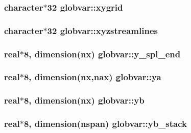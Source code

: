 \subsubsection[{xygrid}]{\setlength{\rightskip}{0pt plus 5cm}character$\ast$32 globvar\+::xygrid}\label{namespaceglobvar_a32441db96414a17de3451c8789d1edb3}
\hypertarget{namespaceglobvar_a683af9844336d830d4c99a6f542260ad}{}
\subsubsection[{xyzstreamlines}]{\setlength{\rightskip}{0pt plus 5cm}character$\ast$32 globvar\+::xyzstreamlines}\label{namespaceglobvar_a683af9844336d830d4c99a6f542260ad}
\hypertarget{namespaceglobvar_a5512ca98f844211a8ecb85b0be7168cc}{}
\subsubsection[{y\+\_\+spl\+\_\+end}]{\setlength{\rightskip}{0pt plus 5cm}real$\ast$8, dimension({\bf nx}) globvar\+::y\+\_\+spl\+\_\+end}\label{namespaceglobvar_a5512ca98f844211a8ecb85b0be7168cc}
\hypertarget{namespaceglobvar_a53530e27d02ce2d76dafdca13f4b8ed7}{}
\subsubsection[{ya}]{\setlength{\rightskip}{0pt plus 5cm}real$\ast$8, dimension({\bf nx},{\bf nax}) globvar\+::ya}\label{namespaceglobvar_a53530e27d02ce2d76dafdca13f4b8ed7}
\hypertarget{namespaceglobvar_a77b51c294ee3b20cb6e14dcbf4cb6b3d}{}
\subsubsection[{yb}]{\setlength{\rightskip}{0pt plus 5cm}real$\ast$8, dimension({\bf nx}) globvar\+::yb}\label{namespaceglobvar_a77b51c294ee3b20cb6e14dcbf4cb6b3d}
\hypertarget{namespaceglobvar_ab911e9efe95d91973d67032e07c25b6e}{}
\subsubsection[{yb\+\_\+stack}]{\setlength{\rightskip}{0pt plus 5cm}real$\ast$8, dimension({\bf nspan}) globvar\+::yb\+\_\+stack}\label{namespaceglobvar_ab911e9efe95d91973d67032e07c25b6e}
\hypertarget{namespaceglobvar_a50b0561e08ecd21444c8d0138e8f23f8}{}
